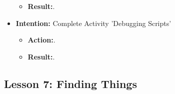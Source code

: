 \documentclass{article}
\begin{document}
\begin{itemize}
\begin{itemize}
\item{\textbf{Result:}.}

\end{itemize}

\item{\textbf{Intention:} Complete Activity 'Debugging Scripts'}

\begin{itemize}
\item{\textbf{Action:}.}

\item{\textbf{Result:}.}

\end{itemize}


\end{itemize}


\subsection{Lesson 7: Finding Things}
\end{document}
